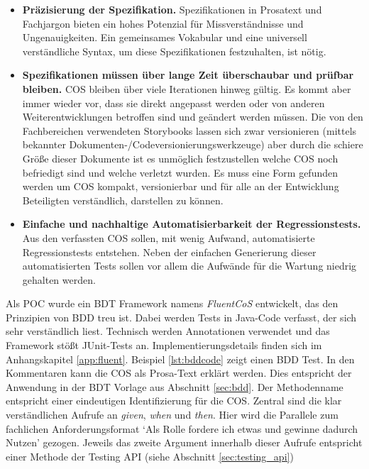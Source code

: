 \begin{itemize}
\item \textbf{Präzisierung der Spezifikation.} Spezifikationen in Prosatext und Fachjargon bieten ein hohes Potenzial für Missverständnisse und Ungenauigkeiten. Ein gemeinsames Vokabular und eine universell verständliche Syntax, um diese Spezifikationen festzuhalten, ist nötig.
\item \textbf{Spezifikationen müssen über lange Zeit überschaubar und prüfbar bleiben.} \Gls{COS} bleiben über viele Iterationen hinweg gültig. Es kommt aber immer wieder vor, dass sie direkt angepasst werden oder von anderen Weiterentwicklungen betroffen sind und geändert werden müssen. Die von den Fachbereichen verwendeten Storybooks lassen sich zwar versionieren (mittels bekannter Dokumenten-/Codeversionierungswerkzeuge) aber durch die schiere Größe dieser Dokumente ist es unmöglich festzustellen welche \Gls{COS} noch befriedigt sind und welche verletzt wurden. Es muss eine Form gefunden werden um \Gls{COS} kompakt, versionierbar und für alle an der Entwicklung Beteiligten verständlich, darstellen zu können.
\item \textbf{Einfache und nachhaltige Automatisierbarkeit der Regressionstests.} Aus den verfassten \Gls{COS} sollen, mit wenig Aufwand, automatisierte Regressionstests entstehen. Neben der einfachen Generierung dieser automatisierten Tests sollen vor allem die Aufwände für die Wartung niedrig gehalten werden.
\end{itemize}

Als \Gls{POC} wurde ein \Gls{BDT} Framework namens \textit{FluentCoS} entwickelt, das den Prinzipien von \Gls{BDD} treu ist. Dabei werden Tests in Java-Code verfasst, der sich sehr verständlich liest. Technisch werden Annotationen verwendet und das Framework stößt JUnit-Tests an. Implementierungsdetails finden sich im Anhangskapitel \ref{app:fluent}. Beispiel \ref{lst:bddcode} zeigt einen \Gls{BDD} Test. In den Kommentaren kann die \Gls{COS} als Prosa-Text erklärt werden. Dies entspricht der Anwendung in der \Gls{BDT} Vorlage aus Abschnitt \ref{sec:bdd}. Der Methodenname entspricht einer eindeutigen Identifizierung für die \Gls{COS}. Zentral sind die klar verständlichen Aufrufe an \textit{given}, \textit{when} und \textit{then}. Hier wird die Parallele zum fachlichen Anforderungsformat `Als Rolle fordere ich etwas und gewinne dadurch Nutzen' gezogen. Jeweils das zweite Argument innerhalb dieser Aufrufe entspricht einer Methode der Testing API (siehe Abschnitt \ref{sec:testing_api})

